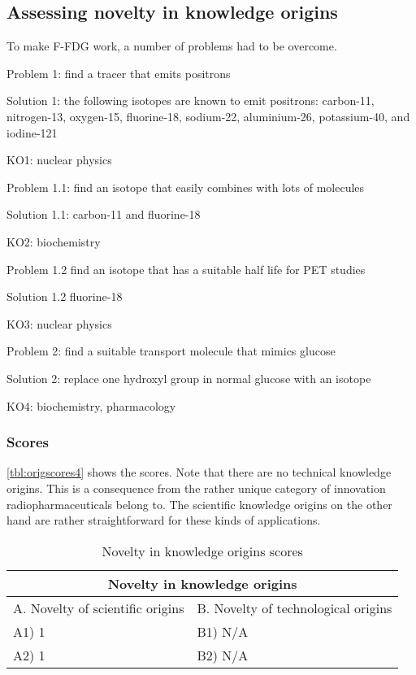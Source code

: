 \subsection{Assessing novelty in knowledge origins}
To make F-FDG work, a number of problems had to be overcome.

Problem 1: find a tracer that emits positrons

Solution 1: the following isotopes are known to emit positrons:  carbon-11,
nitrogen-13, oxygen-15, fluorine-18, sodium-22, aluminium-26, potassium-40, 
and iodine-121

KO1: nuclear physics

Problem 1.1: find an isotope that easily combines with lots of molecules 

Solution 1.1: carbon-11 and fluorine-18 \cite{radiopharma}

KO2: biochemistry

Problem 1.2 find an isotope that has a suitable half life for PET studies

Solution 1.2 fluorine-18

KO3: nuclear physics

Problem 2: find a suitable transport molecule that mimics glucose

Solution 2: replace one hydroxyl group in normal glucose with an isotope 

KO4: biochemistry, pharmacology

\subsubsection{Scores}
\autoref{tbl:origscores4} shows the scores. Note that there are no technical
knowledge origins. This is a consequence from the rather unique category of
innovation radiopharmaceuticals belong to. The scientific knowledge origins on
the other hand are rather straightforward for these kinds of applications.

\begin{table}[h]
\centering
\begin{tabular}{l l}
\hline
\multicolumn{2}{|c|}{Novelty in knowledge origins} \\
\hline
A. Novelty of scientific origins & B. Novelty of technological origins\\
A1) 1 & B1) N/A\\ 
A2) 1 & B2) N/A\\ 
\hline
\end{tabular}
\caption{Novelty in knowledge origins scores}
\label{tbl:origscores4}
\end{table}

